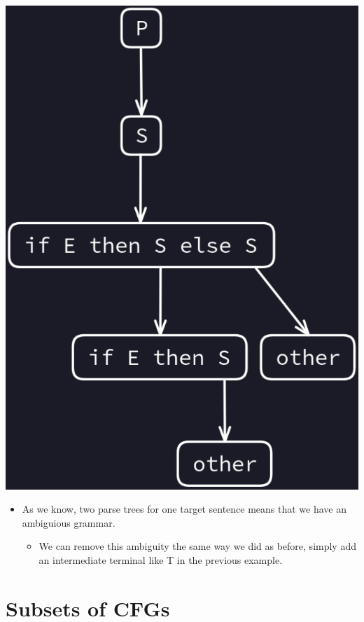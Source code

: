 \documentclass{article}
\begin{document}
\begin{itemize}
\begin{center}
        \includegraphics[scale=0.35]{image5.png}
    \end{center}
    \begin{itemize}
        \item As we know, two parse trees for one target sentence means that we have an ambiguious grammar.
        \pagebreak
        \begin{itemize}
            \item We can remove this ambiguity the same way we did as before, simply add an intermediate terminal like T in the previous example.
        \end{itemize}
    \end{itemize}
\end{itemize}

\section{Subsets of CFGs}
\end{document}
